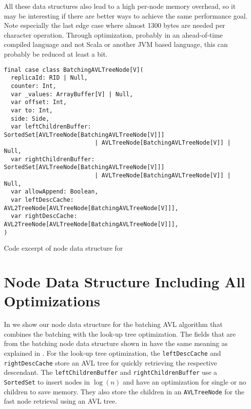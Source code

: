 All these data structures also lead to a high per-node memory overhead, so it may be interesting if there are better ways to achieve the same performance goal. Note especially the last edge case where almost 1300 bytes are needed per character operation. Through optimization, probably in an ahead-of-time compiled language and not Scala or another JVM based language, this can probably be reduced at least a bit.

\begin{listing}
  \begin{verbatim}
final case class BatchingAVLTreeNode[V](
  replicaId: RID | Null,
  counter: Int,
  var _values: ArrayBuffer[V] | Null,
  var offset: Int,
  var to: Int,
  side: Side,
  var leftChildrenBuffer: SortedSet[AVLTreeNode[BatchingAVLTreeNode[V]]]
                          | AVLTreeNode[BatchingAVLTreeNode[V]] | Null,
  var rightChildrenBuffer: SortedSet[AVLTreeNode[BatchingAVLTreeNode[V]]]
                          | AVLTreeNode[BatchingAVLTreeNode[V]] | Null,
  var allowAppend: Boolean,
  var leftDescCache: AVL2TreeNode[AVLTreeNode[BatchingAVLTreeNode[V]]],
  var rightDescCache: AVL2TreeNode[AVLTreeNode[BatchingAVLTreeNode[V]]],
)
\end{verbatim}
  \caption{Code excerpt of node data structure for \protect{}}
  \label{lst:final-code}
\end{listing}

\clearpage

\section{Node Data Structure Including All Optimizations} \label{final-high-level-code-overview}

In  we show our node data structure for the \gls{batching AVL algorithm} that combines the batching with the look-up tree optimization. The fields that are from the batching node data structure shown in  have the same meaning as explained in . For the look-up tree optimization, the \texttt{leftDescCache} and \texttt{rightDescCache} store an AVL tree for quickly retrieving the respective descendant. The \texttt{leftChildrenBuffer} and \texttt{rightChildrenBuffer} use a \texttt{SortedSet} to insert nodes in $\log(n)$ and have an optimization for single or no children to save memory. They also store the children in an \texttt{AVLTreeNode} for the fast node retrieval using an AVL tree.
